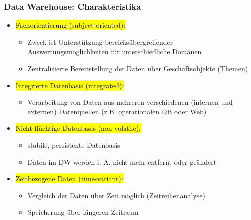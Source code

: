     
\begin{frame}[shrink]
    \frametitle{Data Warehouse: Charakteristika}

    \begin{itemize}
    \item \hl{Fachorientierung (subject-oriented):}
    \begin{itemize}
    \item Zweck ist Unterstützung bereichsübergreifender Auswertungsmöglichkeiten für unterschiedliche Domänen
    \item Zentralisierte Bereitstellung der Daten über Geschäftsobjekte (Themen)
    \end{itemize}
    \item \hl{Integrierte Datenbasis (integrated):}
    \begin{itemize}
    \item Verarbeitung von Daten aus mehreren verschiedenen (internen und externen) Datenquellen (z.B. operationalen DB oder Web)
    \end{itemize}
    \item \hl{Nicht-flüchtige Datenbasis (non-volatile):}
    \begin{itemize}
    \item stabile, persistente Datenbasis
    \item Daten im DW werden i. A. nicht mehr entfernt oder geändert
    \end{itemize}
    \item \hl{Zeitbezogene Daten (time-variant):}
    \begin{itemize}
    \item Vergleich der Daten über Zeit möglich (Zeitreihenanalyse)
    \item Speicherung über längeren Zeitraum
    \end{itemize}
    \end{itemize}

    \end{frame}


